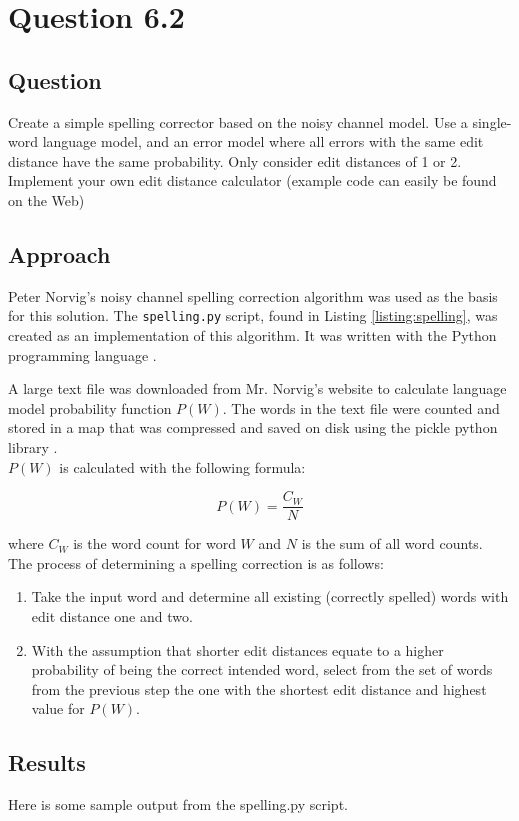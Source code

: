 \section{Question 6.2}

\subsection{Question}
Create a simple spelling corrector based on the noisy channel model. Use a
single-word language model, and an error model where all errors with the same
edit distance have the same probability. Only consider edit distances of 1 or 2.
Implement your own edit distance calculator (example code can easily be found
on the Web)

\subsection{Approach}
Peter Norvig's noisy channel spelling correction algorithm \cite{pnorvig-spell} was used as the basis for this solution.  The \texttt{spelling.py} script, found in Listing \ref{listing:spelling}, was created as an implementation of this algorithm.  It was written with the Python programming language \cite{python}.

A large text file was downloaded from Mr. Norvig's website to calculate language model probability function \(P(W)\).  The words in the text file were counted and stored in a map that was compressed and saved on disk using the pickle python library \cite{py:pickle}.\\

\(P(W)\) is calculated with the following formula:

\[P(W) = \frac{C_W}{N}\]

where \(C_W\) is the word count for word \(W\) and \(N\) is the sum of all word counts.\\

The process of determining a spelling correction is as follows:

\begin{enumerate}
    \item Take the input word and determine all existing (correctly spelled) words with edit distance one and two.
    \item With the assumption that shorter edit distances equate to a higher probability of being the correct intended word, select from the set of words from the previous step the one with the shortest edit distance and highest value for \(P(W)\).
\end{enumerate}

\subsection{Results}
Here is some sample output from the spelling.py script.


